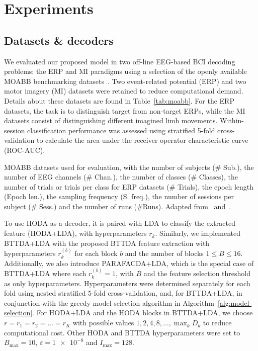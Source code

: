 \documentclass[twocolumn]{article}
\begin{document}
\section{Experiments}
\subsection{Datasets \& decoders}
We evaluated our proposed model in two off-line EEG-based BCI decoding problems: the ERP and MI paradigms using a selection of the openly available MOABB benchmarking
datasets~\cite{Aristimunha2023}.
Two event-related potential (ERP) and two motor imagery (MI) datasets were
retained to reduce computational
demand.
Details about these datasets are found in Table~\ref{tab:moabb}.
For the ERP datasets, the task is to distinguish target from non-target ERPs,
while the MI datasets consist of distinguishing different imagined limb
movements.
Within-session classification performance was assessed using stratified 5-fold
cross-validation to calculate the area under the receiver operator
characteristic curve (ROC-AUC).
\begin{table}[t]
	\centering
	\footnotesize
	
	\caption{MOABB datasets used for evaluation, with the number of
		subjects (\# Sub.), the number of EEG channels (\# Chan.), the number of
    classes (\# Classes), the number of trials or trials per class for ERP
    datasets (\# Trials), the epoch length (Epoch len.), the sampling
		frequency (S. freq.), the number of sessions per subject (\# Sess.) and the
		number of runs (\#Runs).
		Adapted from~\cite{Aristimunha2023} and~\cite{Chevallier2024}.}
	\label{tab:moabb}
\end{table}

To use \textsc{HODA} as a decoder, it is paired with LDA to classify the
extracted feature (HODA+LDA), with hyperparameters $r_k$.
Similarly, we implemented BTTDA+LDA with the proposed \textsc{BTTDA} feature
extraction with hyperparameters $r_k^{(b)}$ for each block $b$ and the number of blocks
$1\leq B\leq16$.
Additionally, we also introduce PARAFACDA+LDA, which is the special case of
BTTDA+LDA where each $r_k^{(b)}=1$, with $B$ and the feature selection
threshold as only hyperparameters.
Hyperparameters were determined separately for each fold using nested
stratified 5-fold cross-validation, and, for BTTDA+LDA, in conjunction with the
greedy model selection algorithm in Algorithm~\ref{alg:model-selection}.
For HODA+LDA and the \textsc{HODA} blocks in BTTDA+LDA, we choose
$r=r_1=r_2=\ldots=r_K$ with possible values
$\textstyle{1,2,4,8,\ldots,\max_kD_k}$
to reduce computational cost.
Other \textsc{HODA} and \textsc{BTTDA} hyperparameters were set to
$B_\text{max}=10$, $\varepsilon=\num{1e-8}$ and $I_\text{max}=128$.
\end{document}

